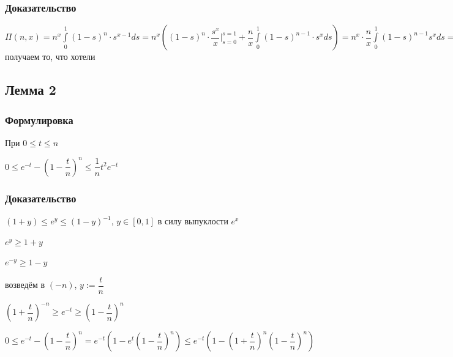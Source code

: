 \documentclass{article}
\begin{document}
            \subsubsection{Доказательство}
            
                $\Pi(n, x) = n^x \int\limits^1_0 (1 - s)^n \cdot s^{x - 1} ds = n^x \left(  (1 - s)^n \cdot \dfrac{s^x}{x} \bigg|^{s = 1}_{s = 0} + \dfrac{n}{x} \int\limits^1_0 (1 - s)^{n - 1} \cdot s^x ds \right) = n^x \cdot \dfrac{n}{x} \int\limits^1_0 (1 - s)^{n - 1} s^x ds = n^x \cdot \dfrac{n}{x} \cdot \dfrac{n - 1}{x + 1} \cdot \int\limits^1_0 (1 - s)^{n - 2} s^{x - 1} ds = \ldots$ получаем то, что хотели
                
        \subsection{Лемма 2}
        
            \subsubsection{Формулировка}
            
                При $0 \leq t \leq n$ 
                
                $0 \leq e^{-t} - \left(1 - \dfrac{t}{n} \right)^n \leq \dfrac{1}{n} t^2 e^{-t}$
                
            \subsubsection{Доказательство}
            
                $(1 + y) \leq e^y \leq (1 - y)^{-1}$, $y \in [0, 1]$ в силу выпуклости $e^x$
                
                $e^y \geq 1 + y$
                
                $e^{-y} \geq 1 - y$
                
                возведём в $(-n)$, $y := \dfrac{t}{n}$
                
                $\left( 1 + \dfrac{t}{n} \right)^{-n} \geq e^{-t} \geq \left(1 - \dfrac{t}{n} \right)^n$
                
                $0 \leq e^{-t} - \left( 1 - \dfrac{t}{n} \right)^n = e^{-t} \left(1 - e^t \left(1 - \dfrac{t}{n} \right)^n \right) \leq e^{-t} \left(1 - \left(1 + \dfrac{t}{n} \right)^n \left( 1 - \dfrac{t}{n}\right)^n\right)$
                
\end{document}
